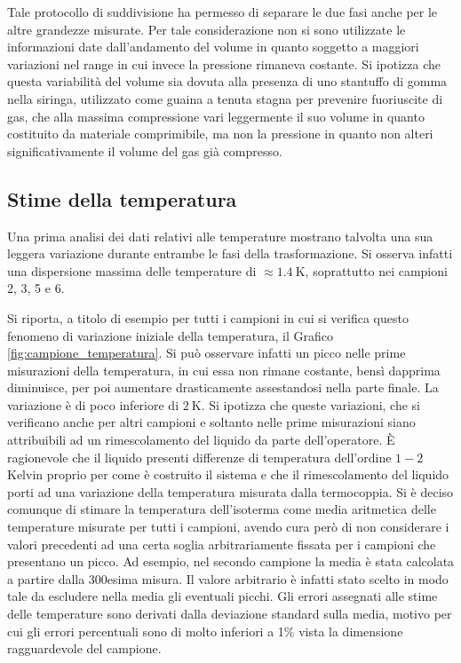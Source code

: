 \documentclass[a4paper,11pt,oneside]{article}
\begin{document}
Tale protocollo di suddivisione ha permesso di separare le due fasi anche per le altre grandezze misurate. Per tale considerazione non si sono utilizzate le informazioni date dall'andamento del volume in quanto soggetto a maggiori variazioni nel range in cui invece la pressione rimaneva costante. Si ipotizza che questa variabilità del volume sia dovuta alla presenza di uno stantuffo di gomma nella siringa, utilizzato come guaina a tenuta stagna per prevenire fuoriuscite di gas, che alla massima compressione vari leggermente il suo volume in quanto costituito da materiale comprimibile, ma non la pressione in quanto non alteri significativamente il volume del gas già compresso.





\subsection{Stime della temperatura}
Una prima analisi dei dati relativi alle temperature mostrano talvolta una sua leggera variazione durante entrambe le fasi della trasformazione. Si osserva infatti una dispersione massima delle temperature di $\approx \SI{1.4}{\kelvin}$, soprattutto nei campioni 2, 3, 5 e 6. 

Si riporta, a titolo di esempio per tutti i campioni in cui si verifica questo fenomeno di variazione iniziale della temperatura, il Grafico \ref{fig:campione_temperatura}. Si può osservare infatti un picco nelle prime misurazioni della temperatura, in cui essa non rimane costante, bensì dapprima diminuisce, per poi aumentare drasticamente assestandosi nella parte finale. La variazione è di poco inferiore di $\SI{2}{\kelvin}$.
Si ipotizza che queste variazioni, che si verificano anche per altri campioni e soltanto nelle prime misurazioni siano attribuibili ad un rimescolamento del liquido da parte dell'operatore. È ragionevole che il liquido presenti differenze di temperatura dell'ordine $1-2$ Kelvin proprio per come è costruito il sistema e che il rimescolamento del liquido porti ad una variazione della temperatura misurata dalla termocoppia. 
Si è deciso comunque di stimare la temperatura dell'isoterma come media aritmetica delle temperature misurate per tutti i campioni, avendo cura però di non considerare i valori precedenti ad una certa soglia arbitrariamente fissata per i campioni che presentano un picco. Ad esempio, nel secondo campione la media è stata calcolata a partire dalla 300esima misura. Il valore arbitrario è infatti stato scelto in modo tale da escludere nella media gli eventuali picchi.  Gli errori assegnati alle stime delle temperature sono derivati dalla deviazione standard sulla media, motivo per cui gli errori percentuali sono di molto inferiori a 1\% vista la dimensione ragguardevole del campione.\newline
\end{document}

